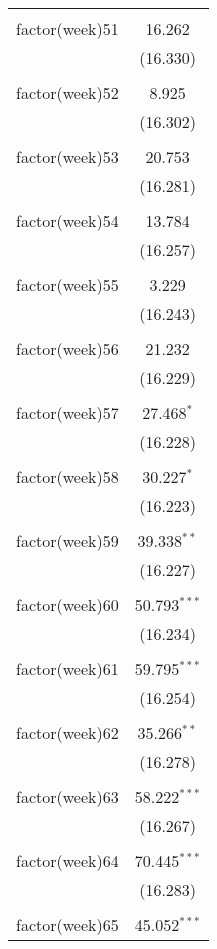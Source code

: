 \documentclass{article}
\begin{document}
\begin{table}[!htbp]
\begin{tabular}{@{\extracolsep{5pt}}lc}
  & \\ 
 factor(week)51 & 16.262 \\ 
  & (16.330) \\ 
  & \\ 
 factor(week)52 & 8.925 \\ 
  & (16.302) \\ 
  & \\ 
 factor(week)53 & 20.753 \\ 
  & (16.281) \\ 
  & \\ 
 factor(week)54 & 13.784 \\ 
  & (16.257) \\ 
  & \\ 
 factor(week)55 & 3.229 \\ 
  & (16.243) \\ 
  & \\ 
 factor(week)56 & 21.232 \\ 
  & (16.229) \\ 
  & \\ 
 factor(week)57 & 27.468$^{*}$ \\ 
  & (16.228) \\ 
  & \\ 
 factor(week)58 & 30.227$^{*}$ \\ 
  & (16.223) \\ 
  & \\ 
 factor(week)59 & 39.338$^{**}$ \\ 
  & (16.227) \\ 
  & \\ 
 factor(week)60 & 50.793$^{***}$ \\ 
  & (16.234) \\ 
  & \\ 
 factor(week)61 & 59.795$^{***}$ \\ 
  & (16.254) \\ 
  & \\ 
 factor(week)62 & 35.266$^{**}$ \\ 
  & (16.278) \\ 
  & \\ 
 factor(week)63 & 58.222$^{***}$ \\ 
  & (16.267) \\ 
  & \\ 
 factor(week)64 & 70.445$^{***}$ \\ 
  & (16.283) \\ 
  & \\ 
 factor(week)65 & 45.052$^{***}$ \\ 

\end{tabular}
\end{table}
\end{document}
